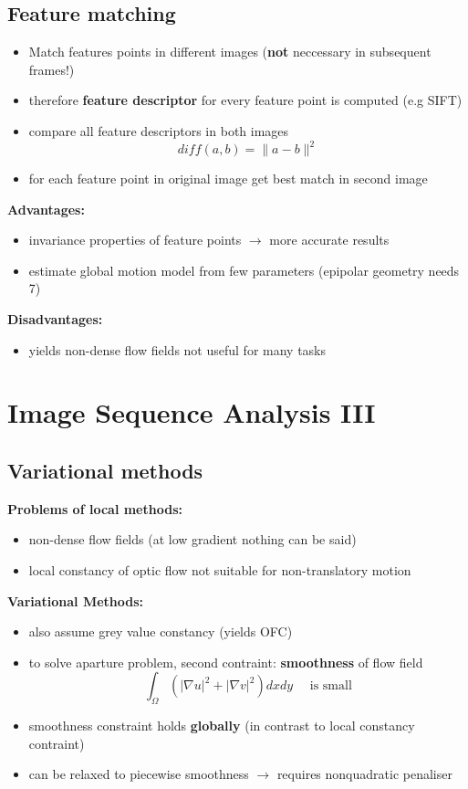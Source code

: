 \documentclass[11pt]{article}
\begin{document}
\subsection{Feature matching}
\label{sec-4-3}
\begin{itemize}
\item Match features points in different images (\textbf{not} neccessary in subsequent frames!)
\item therefore \textbf{feature descriptor} for every feature point is computed (e.g SIFT)
\item compare all feature descriptors in both images
     \[ diff(a,b) = \|a-b\|^2 \]
\item for each feature point in original image get best match in second image
\end{itemize}
\textbf{Advantages:}
\begin{itemize}
\item invariance properties of feature points $\rightarrow$ more accurate results
\item estimate global motion model from few parameters (epipolar geometry needs 7)
\end{itemize}
\textbf{Disadvantages:}
\begin{itemize}
\item yields non-dense flow fields not useful for many tasks
\end{itemize}

\section{Image Sequence Analysis III}
\label{sec-5}
\subsection{Variational methods}
\label{sec-5-1}
\textbf{Problems of local methods:}
\begin{itemize}
\item non-dense flow fields (at low gradient nothing can be said)
\item local constancy of optic flow not suitable for non-translatory motion
\end{itemize}
\textbf{Variational Methods:}
\begin{itemize}
\item also assume grey value constancy (yields OFC)
\item to solve aparture problem, second contraint: \textbf{smoothness} of flow field
     \[ \int_\Omega (|\nabla u|^2 + |\nabla v|^2) dx dy \quad \text{ is small} \]
\item smoothness constraint holds \textbf{globally} (in contrast to local constancy contraint)
\item can be relaxed to piecewise smoothness $\rightarrow$ requires nonquadratic penaliser
\end{itemize}
\end{document}
